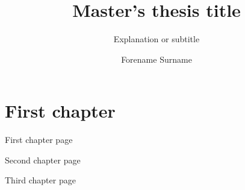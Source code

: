 \documentclass[nocopyright]{uit-thesis-test}
\begin{document}
\title{Master's thesis title}
\subtitle{Explanation or subtitle}
\author{Forename Surname}

\maketitle

\frontmatter

\tableofcontents

\mainmatter

\chapter{First chapter}

First chapter page

\newpage

Second chapter page

\newpage

Third chapter page
\end{document}
